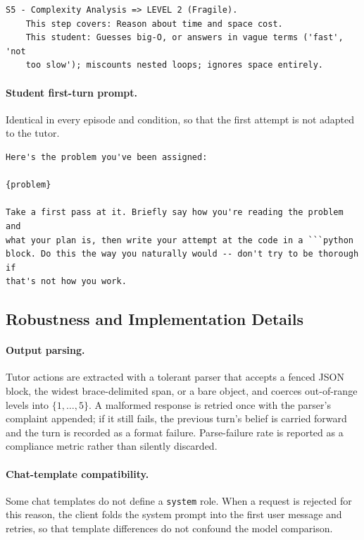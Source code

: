 \begin{lstlisting}[style=promptstyle,caption={Persona entry format, shown for one stage.},label={lst:persona}]
S5 - Complexity Analysis => LEVEL 2 (Fragile).
    This step covers: Reason about time and space cost.
    This student: Guesses big-O, or answers in vague terms ('fast', 'not
    too slow'); miscounts nested loops; ignores space entirely.
\end{lstlisting}

\paragraph{Student first-turn prompt.} Identical in every episode and
condition, so that the first attempt is not adapted to the tutor.

\begin{lstlisting}[style=promptstyle]
Here's the problem you've been assigned:

{problem}

Take a first pass at it. Briefly say how you're reading the problem and
what your plan is, then write your attempt at the code in a ```python
block. Do this the way you naturally would -- don't try to be thorough if
that's not how you work.
\end{lstlisting}

\subsection{Robustness and Implementation Details}
\label{app:robustness}

\paragraph{Output parsing.} Tutor actions are extracted with a tolerant parser
that accepts a fenced JSON block, the widest brace-delimited span, or a bare
object, and coerces out-of-range levels into $\{1,\dots,5\}$. A malformed
response is retried once with the parser's complaint appended; if it still
fails, the previous turn's belief is carried forward and the turn is recorded
as a format failure. Parse-failure rate is reported as a compliance metric
rather than silently discarded.

\paragraph{Chat-template compatibility.} Some chat templates do not define a
\texttt{system} role. When a request is rejected for this reason, the client
folds the system prompt into the first user message and retries, so that
template differences do not confound the model comparison.

